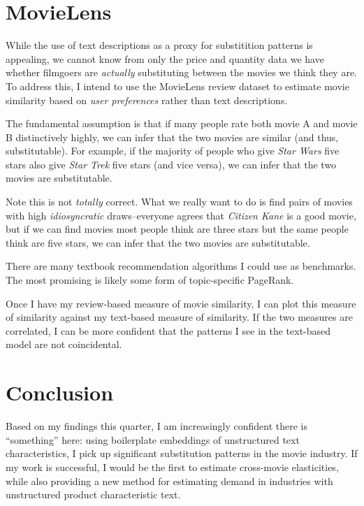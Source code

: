 \documentclass{article}
\begin{document}
\section{MovieLens}

While the use of text descriptions as a proxy for substitition patterns is appealing, we cannot know from only the price and quantity data we have whether filmgoers are \emph{actually} substituting between the movies we think they are. To address this, I intend to use the MovieLens review dataset to estimate movie similarity based on \emph{user preferences} rather than text descriptions. 

The fundamental assumption is that if many people rate both movie A and movie B distinctively highly, we can infer that the two movies are similar (and thus, substitutable). For example, if the majority of people who give \emph{Star Wars} five stars also give \emph{Star Trek} five stars (and vice versa), we can infer that the two movies are substitutable. 

Note this is not \emph{totally} correct. What we really want to do is find pairs of movies with high \emph{idiosyncratic} draws--everyone agrees that \emph{Citizen Kane} is a good movie, but if we can find movies most people think are three stars but the same people think are five stars, we can infer that the two movies are substitutable.

There are many textbook recommendation algorithms I could use as benchmarks. The most promising is likely some form of topic-specific PageRank. 

Once I have my review-based measure of movie similarity, I can plot this measure of similarity against my text-based measure of similarity. If the two measures are correlated, I can be more confident that the patterns I see in the text-based model are not coincidental. 


\section{Conclusion}

Based on my findings this quarter, I am increasingly confident there is ``something'' here: using boilerplate embeddings of unstructured text characteristics, I pick up significant substitution patterns in the movie industry. If my work is successful, I would be the first to estimate cross-movie elasticities, while also providing a new method for estimating demand in industries with unstructured product characteristic text.
\end{document}
